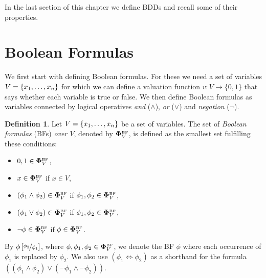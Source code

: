 \documentclass[
  digital, %
  color,
  twoside, %
  table,   %
  nolof,     %
  nolot,     %
]{fithesis3}
\let\setbuilder\set
\newcommand{\simpleset}[1]{\{{#1}\}}
\renewcommand{\set}[1]{\normalexpandarg\IfSubStr{#1}{|}{\setbuilder{#1}}{\simpleset{#1}}}
\theoremstyle{definition}
\newtheorem{definition}{Definition}
\theoremstyle{remark}
\newcommand{\substitute}[2]{\left[ \nicefrac{#2}{#1} \right]}
\newcommand{\BF}[1]{\mathbf{\Phi}_{#1}^{\normalfont{\text{\tiny BF}}}}
\newcommand{\lequal}{\Leftrightarrow}
\begin{document}
In the last section of this chapter we define BDDs and recall some of their properties.

\section{Boolean Formulas}
We first start with defining Boolean formulas. For these we need a set of variables $V = \set{x_1, \dots, x_n}$ for which we can define a valuation function $v\colon V \to \{0,1\}$ that says whether each variable is true or false. We then define Boolean formulas as variables connected by logical operatives \emph{and} (${\land}$), \emph{or} (${\lor}$) and \emph{negation} (${\neg}$).

\begin{definition}
Let $V = \set{x_1, \dots, x_n}$ be a set of variables. The set of \emph{Boolean formulas} (BFs) \emph{over $V$}, denoted by $\BF{V}$, is defined as the smallest set fulfilling these conditions:
\begin{itemize}
    \item $0,1 \in \BF{V}$,
    \item $x \in \BF{V}$ if $x \in V$,
    \item $(\phi_1 \land \phi_2) \in \BF{V}$ if $\phi_1, \phi_2 \in \BF{V}$,
    \item $(\phi_1 \lor \phi_2) \in \BF{V}$ if $\phi_1, \phi_2 \in \BF{V}$,
    \item $\neg\phi \in \BF{V}$ if $\phi \in \BF{V}$.
\end{itemize}
\end{definition}
By $\phi\substitute{\phi_1}{\phi_2}$, where $\phi,\phi_1,\phi_2 \in \BF{V}$, we denote the BF $\phi$ where each occurrence of $\phi_1$ is replaced by $\phi_2$. We also use $(\phi_1 \lequal \phi_2)$ as a shorthand for the formula $((\phi_1 \land \phi_2) \lor (\neg \phi_1 \land \neg \phi_2))$.
\end{document}

